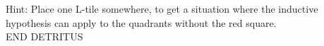 \documentclass[12pt]{article}
\begin{document}
{\noindent Hint: Place one L-tile somewhere, to get a situation where the inductive hypothesis can apply to the quadrants without the red square.\\

END DETRITUS }
\end{document}
